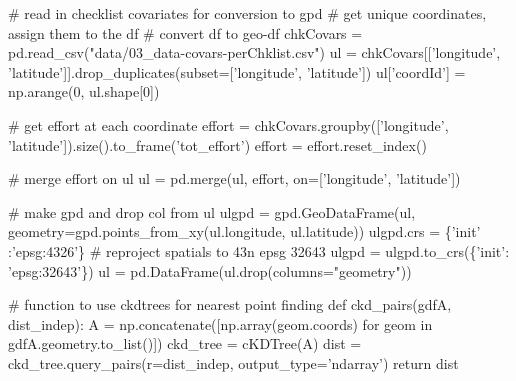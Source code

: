 \documentclass[]{article}
\newenvironment{Shaded}{}{}
\newcommand{\CommentTok}[1]{\textcolor[rgb]{0.00,0.50,0.00}{#1}}
\newcommand{\ControlFlowTok}[1]{\textcolor[rgb]{0.00,0.00,1.00}{#1}}
\newcommand{\DecValTok}[1]{#1}
\newcommand{\KeywordTok}[1]{\textcolor[rgb]{0.00,0.00,1.00}{#1}}
\newcommand{\NormalTok}[1]{#1}
\newcommand{\OperatorTok}[1]{#1}
\newcommand{\StringTok}[1]{\textcolor[rgb]{0.00,0.50,0.50}{#1}}
\begin{document}
\begin{Shaded}
\begin{Highlighting}[numbers=left,,]
\CommentTok{# read in checklist covariates for conversion to gpd}
\CommentTok{# get unique coordinates, assign them to the df}
\CommentTok{# convert df to geo-df}
\NormalTok{chkCovars }\OperatorTok{=}\NormalTok{ pd.read_csv(}\StringTok{"data/03_data-covars-perChklist.csv"}\NormalTok{)}
\NormalTok{ul }\OperatorTok{=}\NormalTok{ chkCovars[[}\StringTok{'longitude'}\NormalTok{, }\StringTok{'latitude'}\NormalTok{]].drop_duplicates(subset}\OperatorTok{=}\NormalTok{[}\StringTok{'longitude'}\NormalTok{, }\StringTok{'latitude'}\NormalTok{])}
\NormalTok{ul[}\StringTok{'coordId'}\NormalTok{] }\OperatorTok{=}\NormalTok{ np.arange(}\DecValTok{0}\NormalTok{, ul.shape[}\DecValTok{0}\NormalTok{])}

\CommentTok{# get effort at each coordinate}
\NormalTok{effort }\OperatorTok{=}\NormalTok{ chkCovars.groupby([}\StringTok{'longitude'}\NormalTok{, }\StringTok{'latitude'}\NormalTok{]).size().to_frame(}\StringTok{'tot_effort'}\NormalTok{)}
\NormalTok{effort }\OperatorTok{=}\NormalTok{ effort.reset_index()}

\CommentTok{# merge effort on ul}
\NormalTok{ul }\OperatorTok{=}\NormalTok{ pd.merge(ul, effort, on}\OperatorTok{=}\NormalTok{[}\StringTok{'longitude'}\NormalTok{, }\StringTok{'latitude'}\NormalTok{])}

\CommentTok{# make gpd and drop col from ul}
\NormalTok{ulgpd }\OperatorTok{=}\NormalTok{ gpd.GeoDataFrame(ul, geometry}\OperatorTok{=}\NormalTok{gpd.points_from_xy(ul.longitude, ul.latitude))}
\NormalTok{ulgpd.crs }\OperatorTok{=}\NormalTok{ \{}\StringTok{'init'}\NormalTok{ :}\StringTok{'epsg:4326'}\NormalTok{\}}
\CommentTok{# reproject spatials to 43n epsg 32643}
\NormalTok{ulgpd }\OperatorTok{=}\NormalTok{ ulgpd.to_crs(\{}\StringTok{'init'}\NormalTok{: }\StringTok{'epsg:32643'}\NormalTok{\})}
\NormalTok{ul }\OperatorTok{=}\NormalTok{ pd.DataFrame(ul.drop(columns}\OperatorTok{=}\StringTok{"geometry"}\NormalTok{))}

\CommentTok{# function to use ckdtrees for nearest point finding}
\KeywordTok{def}\NormalTok{ ckd_pairs(gdfA, dist_indep):}
\NormalTok{    A }\OperatorTok{=}\NormalTok{ np.concatenate([np.array(geom.coords) }\ControlFlowTok{for}\NormalTok{ geom }\KeywordTok{in}\NormalTok{ gdfA.geometry.to_list()])}
\NormalTok{    ckd_tree }\OperatorTok{=}\NormalTok{ cKDTree(A)}
\NormalTok{    dist }\OperatorTok{=}\NormalTok{ ckd_tree.query_pairs(r}\OperatorTok{=}\NormalTok{dist_indep, output_type}\OperatorTok{=}\StringTok{'ndarray'}\NormalTok{)}
    \ControlFlowTok{return}\NormalTok{ dist}


\end{Highlighting}
\end{Shaded}
\end{document}
